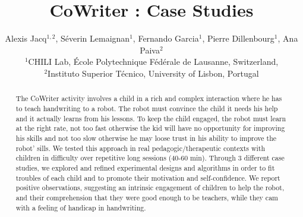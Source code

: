 \documentclass{sig-alternate}
\begin{document}

\title{CoWriter : Case Studies}

\author{Alexis Jacq$^{1,2}$, S\'everin Lemaignan$^1$, Fernando Garcia$^1$, Pierre Dillenbourg$^1$, Ana Paiva$^2$\\
$^1$CHILI Lab, \'Ecole Polytechnique F\'ed\'erale de Lausanne, Switzerland,\\
$^2$Instituto Superior T\'{e}cnico, University of Lisbon, Portugal}


%
%


\maketitle
\begin{abstract}

The CoWriter activity involves a child in a rich and complex interaction where he has to
teach handwriting to a robot. The robot must convince the child it needs his help and it
actually learns from his lessons. To keep the child engaged, 
the robot must learn at the right rate, not too fast otherwise the kid will have
no opportunity for improving his skills and not too slow otherwise he may loose
trust in his ability to improve the robot' sills.
We tested this approach in real pedagogic/therapeutic contexts with
children in difficulty over repetitive long sessions (40-60 min). Through 3 different
case studies, we explored and refined experimental designs and algorithms in order to fit
troubles of each child and to promote their motivation and self-confidence. We report positive observations, suggesting an intrinsic engagement of children to help the
robot, and their comprehension that they were good enough to be teachers, while they cam with
a feeling of handicap in handwriting. 

\end{abstract}
\end{document}
